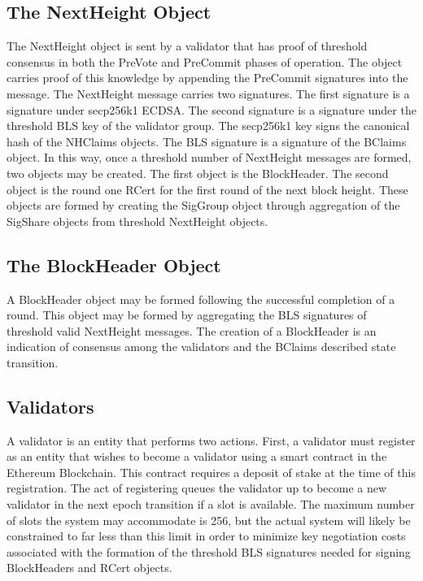 \subsection{The NextHeight Object}



The NextHeight object is sent by a validator that has proof of
threshold consensus in both the PreVote and PreCommit phases of
operation.
The object carries proof of this knowledge by appending the PreCommit
signatures into the message.
The NextHeight message carries two signatures.
The first signature is a signature under secp256k1 ECDSA.
The second signature is a signature under the threshold BLS key of the
validator group.
The secp256k1 key signs the canonical hash of the NHClaims objects.
The BLS signature is a signature of the BClaims object.
In this way, once a threshold number of NextHeight messages are formed,
two objects may be created.
The first object is the BlockHeader.
The second object is the round one RCert for the first round of the
next block height.
These objects are formed by creating the SigGroup object through
aggregation of the SigShare objects from threshold NextHeight objects.


\subsection{The BlockHeader Object}



A BlockHeader object may be formed following the successful completion
of a round.
This object may be formed by aggregating the BLS signatures of
threshold valid NextHeight messages.
The creation of a BlockHeader is an indication of consensus among the
validators and the BClaims described state transition.


\subsection{Validators}

A validator is an entity that performs two actions.
First, a validator must register as an entity that wishes to become a
validator using a smart contract in the Ethereum Blockchain.
This contract requires a deposit of stake at the time of this
registration.
The act of registering queues the validator up to become a new
validator in the next epoch transition if a slot is available.
The maximum number of slots the system may accommodate is 256, but the
actual system will likely be constrained to far less than this limit in
order to minimize key negotiation costs associated with the formation
of the threshold BLS signatures needed for signing BlockHeaders and
RCert objects.


